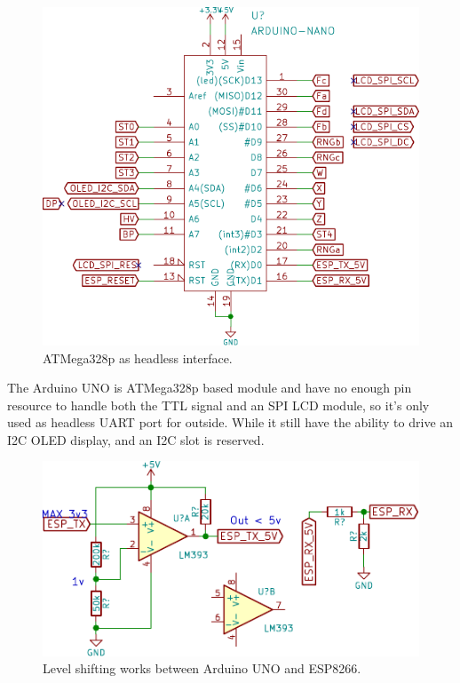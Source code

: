 \documentclass[a4paper,10pt]{article}
\begin{document}
\begin{figure}[h!t] \centering
    \includegraphics{figures/sch-smartshow-atmega328p.pdf}
    \caption{ATMega328p as headless interface.} \label{fig:smartshow-atmega328p}
\end{figure}

The Arduino UNO is ATMega328p based module and have no enough pin resource to handle both the TTL signal
and an SPI LCD module, so it's only used as headless UART port for outside. While it still have the ability
to drive an I2C OLED display, and an I2C slot is reserved.

\begin{figure}[h!t] \centering
    \includegraphics[width=0.8\linewidth]{figures/sch-smartshow-levelshift.pdf}
    \caption{Level shifting works between Arduino UNO and ESP8266.} \label{fig:levelshift}
\end{figure}
\end{document}
